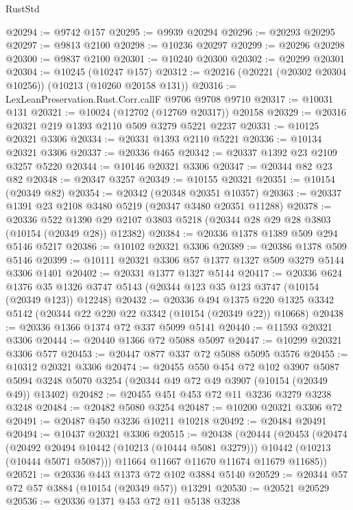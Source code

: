 \begin{lexlean}{RustStd}
\begin{coremodule}
{\begin{coremodule}
{{{{{{{{{{{{{{{{{{{{{{{{{{@20294 := @9742 @157
@20295 := @9939 @20294
@20296 := @20293 @20295
@20297 := @9813 @2100
@20298 := @10236 @20297
@20299 := @20296 @20298
@20300 := @9837 @2100
@20301 := @10240 @20300
@20302 := @20299 @20301
@20304 := @10245 (@10247 @157)
@20312 := @20216 (@20221 (@20302 @20304 @10256)) (@10213 (@10260 @20158 @131))
@20316 := LexLeanPreservation.Rust.Corr.callF @9706 @9708 @9710
@20317 := @10031 @131
@20321 := @10024 (@12702 (@12769 @20317)) @20158
@20329 := @20316 @20321 @219 @1393 @2110 @509 @3279 @5221 @2237
@20331 := @10125 @20321 @3306
@20334 := @20331 @1393 @2110 @5221
@20336 := @10134 @20321 @3306
@20337 := @20336 @465
@20342 := @20337 @1392 @23 @2109 @3257 @5220
@20344 := @10146 @20321 @3306
@20347 := @20344 @82 @23 @82
@20348 := @20347 @3257
@20349 := @10155 @20321
@20351 := @10154 (@20349 @82)
@20354 := @20342 (@20348 @20351 @10357)
@20363 := @20337 @1391 @23 @2108 @3480 @5219 (@20347 @3480 @20351 @11288)
@20378 := @20336
    @522
    @1390
    @29
    @2107
    @3803
    @5218
    (@20344 @28 @29 @28 @3803 (@10154 (@20349 @28)) @12382)
@20384 := @20336 @1378 @1389 @509 @294 @5146 @5217
@20386 := @10102 @20321 @3306
@20389 := @20386 @1378 @509 @5146
@20399 := @10111 @20321 @3306 @57 @1377 @1327 @509 @3279 @5144 @3306 @1401
@20402 := @20331 @1377 @1327 @5144
@20417 := @20336
    @624
    @1376
    @35
    @1326
    @3747
    @5143
    (@20344 @123 @35 @123 @3747 (@10154 (@20349 @123)) @12248)
@20432 := @20336
    @494
    @1375
    @220
    @1325
    @3342
    @5142
    (@20344 @22 @220 @22 @3342 (@10154 (@20349 @22)) @10668)
@20438 := @20336 @1366 @1374 @72 @337 @5099 @5141
@20440 := @11593 @20321 @3306
@20444 := @20440 @1366 @72 @5088 @5097
@20447 := @10299 @20321 @3306 @577
@20453 := @20447 @877 @337 @72 @5088 @5095 @3576
@20455 := @10312 @20321 @3306
@20474 := @20455
    @550
    @454
    @72
    @102
    @3907
    @5087
    @5094
    @3248
    @5070
    @3254
    (@20344 @49 @72 @49 @3907 (@10154 (@20349 @49)) @13402)
@20482 := @20455 @451 @453 @72 @11 @3236 @3279 @3238 @3248
@20484 := @20482 @5080 @3254
@20487 := @10200 @20321 @3306 @72
@20491 := @20487 @450 @3236 @10211 @10218
@20492 := @20484 @20491
@20494 := @10437 @20321 @3306
@20515 := @20438
    (@20444
      (@20453
        (@20474
          (@20492 @20494 @10442 (@10213 (@10444 @5081 @3279)))
          @10442
          (@10213 (@10444 @5071 @5087)))
        @11664
        @11667
        @11670
        @11674
        @11679
        @11685))
@20521 := @20336 @443 @1373 @72 @102 @3884 @5140
@20529 := @20344 @57 @72 @57 @3884 (@10154 (@20349 @57)) @13291
@20530 := @20521 @20529
@20536 := @20336 @1371 @453 @72 @11 @5138 @3238
}}}}}}}}}}}}}}}}}}}}}}}}}}
\end{coremodule}}
\end{coremodule}
\end{lexlean}
